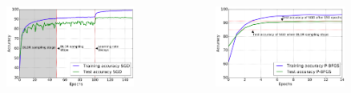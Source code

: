 \documentclass[t]{beamer}
\begin{document}
\begin{frame}
\begin{columns}[c]

\begin{column}{0.5\textwidth}
\begin{figure}
\includegraphics[width=0.99\textwidth]{exp-2}
\end{figure}
\end{column}

\begin{column}{0.5\textwidth}
\begin{figure}
\includegraphics[width=0.99\textwidth]{exp-3}
\end{figure}
\end{column}

\end{columns}
\vspace{1cm}
\end{frame}
\end{document}
